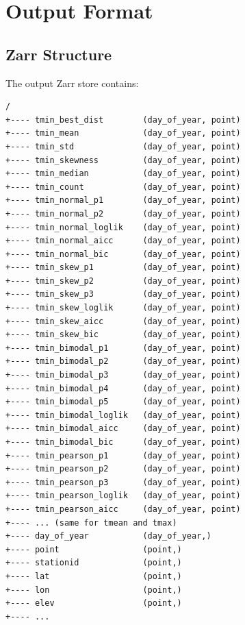 ﻿\documentclass[12pt,a4paper]{report}
\begin{document}
\chapter{Output Format}
\section{Zarr Structure}
The output Zarr store contains:
\begin{lstlisting}[caption=Output Zarr Structure]
/
+---- tmin_best_dist        (day_of_year, point)
+---- tmin_mean             (day_of_year, point)
+---- tmin_std              (day_of_year, point)
+---- tmin_skewness         (day_of_year, point)
+---- tmin_median           (day_of_year, point)
+---- tmin_count            (day_of_year, point)
+---- tmin_normal_p1        (day_of_year, point)
+---- tmin_normal_p2        (day_of_year, point)
+---- tmin_normal_loglik    (day_of_year, point)
+---- tmin_normal_aicc      (day_of_year, point)
+---- tmin_normal_bic       (day_of_year, point)
+---- tmin_skew_p1          (day_of_year, point)
+---- tmin_skew_p2          (day_of_year, point)
+---- tmin_skew_p3          (day_of_year, point)
+---- tmin_skew_loglik      (day_of_year, point)
+---- tmin_skew_aicc        (day_of_year, point)
+---- tmin_skew_bic         (day_of_year, point)
+---- tmin_bimodal_p1       (day_of_year, point)
+---- tmin_bimodal_p2       (day_of_year, point)
+---- tmin_bimodal_p3       (day_of_year, point)
+---- tmin_bimodal_p4       (day_of_year, point)
+---- tmin_bimodal_p5       (day_of_year, point)
+---- tmin_bimodal_loglik   (day_of_year, point)
+---- tmin_bimodal_aicc     (day_of_year, point)
+---- tmin_bimodal_bic      (day_of_year, point)
+---- tmin_pearson_p1       (day_of_year, point)
+---- tmin_pearson_p2       (day_of_year, point)
+---- tmin_pearson_p3       (day_of_year, point)
+---- tmin_pearson_loglik   (day_of_year, point)
+---- tmin_pearson_aicc     (day_of_year, point)
+---- ... (same for tmean and tmax)
+---- day_of_year           (day_of_year,)
+---- point                 (point,)
+---- stationid             (point,)
+---- lat                   (point,)
+---- lon                   (point,)
+---- elev                  (point,)
+---- ...
\end{lstlisting}
\end{document}
